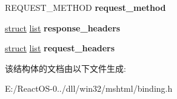\begin{DoxyCompactItemize}
R\+E\+Q\+U\+E\+S\+T\+\_\+\+M\+E\+T\+H\+OD {\bfseries request\+\_\+method}
\item 
\mbox{\label{structns_channel_aa50c0f2bd6df42cd837fe9fd2056333a}} 
\hyperlink{interfacestruct}{struct} \hyperlink{classlist}{list} {\bfseries response\+\_\+headers}
\item 
\mbox{\label{structns_channel_a4fce5c780ff6487e103edefc44c01e75}} 
\hyperlink{interfacestruct}{struct} \hyperlink{classlist}{list} {\bfseries request\+\_\+headers}
\end{DoxyCompactItemize}


该结构体的文档由以下文件生成\+:\begin{DoxyCompactItemize}
\item 
E\+:/\+React\+O\+S-\/0../dll/win32/mshtml/binding.\+h\end{DoxyCompactItemize}
